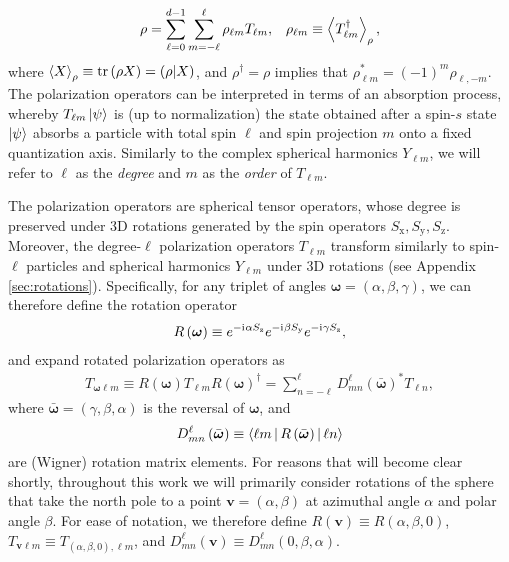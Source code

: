 \documentclass[nofootinbib,twocolumn]{revtex4-1}
\newcommand{\p}[1]{\left(#1\right)} %
\newcommand{\bk}{\Braket} %
\renewcommand{\i}{\mathrm{i}\mkern1mu} %
\newcommand{\x}{\text{x}}
\newcommand{\y}{\text{y}}
\newcommand{\z}{\text{z}}
\def\obk#1{\mathinner{({#1})}}
\begin{document}
\begin{align}
  \rho = \sum_{\ell=0}^{d-1} \sum_{m=-\ell}^\ell
  \rho_{\ell m} T_{\ell m},
  &&
  \rho_{\ell m} \equiv \bk{T_{\ell m}^\dag}_\rho,
  \label{eq:trans_state}
\end{align}
where $\bk{X}_\rho\equiv\tr\p{\rho X}=\obk{\rho|X}$, and $\rho^\dag=\rho$ implies that $\rho_{\ell m}^*=\p{-1}^m\rho_{\ell,-m}$.
The polarization operators can be interpreted in terms of an absorption process, whereby $T_{\ell m}\ket\psi$ is (up to normalization) the state obtained after a spin-$s$ state $\ket\psi$ absorbs a particle with total spin $\ell$ and spin projection $m$ onto a fixed quantization axis.
Similarly to the complex spherical harmonics $Y_{\ell m}$, we will refer to $\ell$ as the {\it degree} and $m$ as the {\it order} of $T_{\ell m}$.

The polarization operators are spherical tensor operators, whose degree is preserved under 3D rotations generated by the spin operators $S_\x,S_\y,S_\z$.
Moreover, the degree-$\ell$ polarization operators $T_{\ell m}$ transform similarly to spin-$\ell$ particles and spherical harmonics $Y_{\ell m}$ under 3D rotations (see Appendix \ref{sec:rotations}).
Specifically, for any triplet of angles $\bm\omega=\p{\alpha,\beta,\gamma}$, we can therefore define the rotation operator
\begin{align}
  R\p{\bm\omega} \equiv e^{-\i\alpha S_\z} e^{-\i\beta S_\y} e^{-\i\gamma S_\z},
\end{align}
and expand rotated polarization operators as
\begin{align}
  T_{\bm\omega\ell m} \equiv
  R\p{\bm\omega} T_{\ell m} R\p{\bm\omega}^\dag
  = \sum_{n=-\ell}^\ell D_{mn}^\ell\p{\bar{\bm\omega}}^* T_{\ell n},
  \label{eq:trans_rot}
\end{align}
where $\bar{\bm\omega}=\p{\gamma,\beta,\alpha}$ is the reversal of $\bm\omega$, and
\begin{align}
  D_{mn}^\ell\p{\bar{\bm\omega}}
  \equiv \bk{\ell m|R\p{\bar{\bm\omega}}|\ell n}
  \label{eq:wigner_D}
\end{align}
are (Wigner) rotation matrix elements.
For reasons that will become clear shortly, throughout this work we will primarily consider rotations of the sphere that take the north pole to a point $\bm v=\p{\alpha,\beta}$ at azimuthal angle $\alpha$ and polar angle $\beta$.
For ease of notation, we therefore define $R\p{\bm v} \equiv R\p{\alpha,\beta,0}$, $T_{\bm v\ell m} \equiv T_{\p{\alpha,\beta,0},\ell m}$, and $D^\ell_{mn}\p{\bm v} \equiv D^\ell_{mn}\p{0,\beta,\alpha}$.
\end{document}
